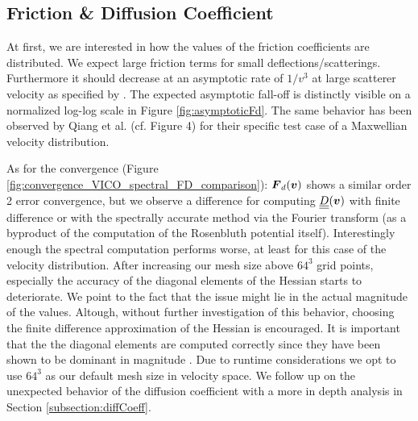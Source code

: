 \subsection{Friction \& Diffusion Coefficient}

At first, we are interested in how the values of the friction coefficients are distributed. We expect large
friction terms for small deflections/scatterings. Furthermore it should decrease at
an asymptotic rate of $1/v^3$ at large scatterer velocity as specified by \cite{manheimer1997langevin}.
The expected asymptotic fall-off is distinctly visible on a normalized log-log scale in Figure \ref{fig:asymptoticFd}.
The same behavior has been observed by Qiang et al. \cite{qiang2000self} (cf. Figure 4) for their specific test case of a
Maxwellian velocity distribution.

As for the convergence (Figure \ref{fig:convergence_VICO_spectral_FD_comparison}): $\boldsymbol{F}_d(\boldsymbol{v})$ shows a similar order 2 error
convergence,
but we observe a difference for computing $\underline{\underline{D}}(\boldsymbol{v})$ with finite difference or with the
spectrally accurate method via the Fourier transform (as a byproduct of the computation of the Rosenbluth potential itself).
Interestingly enough the spectral computation performs worse, at least for this case of the velocity
distribution.
After increasing our mesh size above $64^3$ grid points, especially the accuracy of the diagonal elements of the Hessian
starts to deteriorate.
We point to the fact that the issue might lie in the actual magnitude of the values.
Altough, without further investigation of this behavior, choosing the finite difference approximation of the
Hessian is encouraged.
It is important that the the diagonal elements are computed correctly since they 
have been shown to be dominant in magnitude \cite{manheimer1997langevin}.
Due to runtime considerations we opt to use $64^3$ as our default mesh size in velocity space.
We follow up on the unexpected behavior of the diffusion coefficient with a more in depth analysis in Section \ref{subsection:diffCoeff}.

